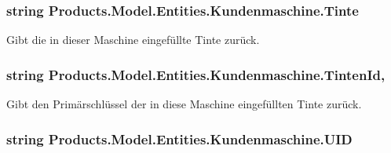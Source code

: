 \subsubsection[{\texorpdfstring{Tinte}{Tinte}}]{\setlength{\rightskip}{0pt plus 5cm}string Products.\+Model.\+Entities.\+Kundenmaschine.\+Tinte\hspace{0.3cm}{\ttfamily [get]}}\hypertarget{class_products_1_1_model_1_1_entities_1_1_kundenmaschine_ad371528f1113a314be9e3088fbe4cd07}{}\label{class_products_1_1_model_1_1_entities_1_1_kundenmaschine_ad371528f1113a314be9e3088fbe4cd07}


Gibt die in dieser Maschine eingefüllte Tinte zurück. 

\subsubsection[{\texorpdfstring{Tinten\+Id}{TintenId}}]{\setlength{\rightskip}{0pt plus 5cm}string Products.\+Model.\+Entities.\+Kundenmaschine.\+Tinten\+Id\hspace{0.3cm}{\ttfamily [get]}, {\ttfamily [set]}}\hypertarget{class_products_1_1_model_1_1_entities_1_1_kundenmaschine_ae0f77ae6730a30ab90ac5e11c016154f}{}\label{class_products_1_1_model_1_1_entities_1_1_kundenmaschine_ae0f77ae6730a30ab90ac5e11c016154f}


Gibt den Primärschlüssel der in diese Maschine eingefüllten Tinte zurück. 

\subsubsection[{\texorpdfstring{U\+ID}{UID}}]{\setlength{\rightskip}{0pt plus 5cm}string Products.\+Model.\+Entities.\+Kundenmaschine.\+U\+ID\hspace{0.3cm}{\ttfamily [get]}}\hypertarget{class_products_1_1_model_1_1_entities_1_1_kundenmaschine_adfb293d404d78c4fc59ba62ca87ddbc6}{}\label{class_products_1_1_model_1_1_entities_1_1_kundenmaschine_adfb293d404d78c4fc59ba62ca87ddbc6}


